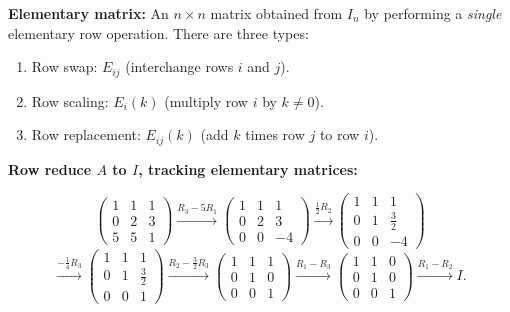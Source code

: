 \documentclass[12pt,a3paper]{article}
\begin{document}
\begin{tcolorbox}[enhanced,breakable,
  colback=cA!4,colframe=cA,boxrule=0.8pt,arc=5pt,
  title={\textbf{Answer --- Elementary Matrices; $A=\begin{pmatrix}1&1&1\\0&2&3\\5&5&1\end{pmatrix}$ as Product}},
  fonttitle=\bfseries\color{white},colbacktitle=cA]
 
\textbf{Elementary matrix:} An $n\times n$ matrix obtained from $I_n$ by performing a \emph{single} elementary row operation. There are three types:
\begin{enumerate}[label=(\roman*),itemsep=2pt]
  \item Row swap: $E_{ij}$ (interchange rows $i$ and $j$).
  \item Row scaling: $E_i(k)$ (multiply row $i$ by $k\neq0$).
  \item Row replacement: $E_{ij}(k)$ (add $k$ times row $j$ to row $i$).
\end{enumerate}
 
\textbf{Row reduce $A$ to $I$, tracking elementary matrices:}
 
\[
\begin{pmatrix}1&1&1\\0&2&3\\5&5&1\end{pmatrix}
\xrightarrow{R_3-5R_1}
\begin{pmatrix}1&1&1\\0&2&3\\0&0&-4\end{pmatrix}
\xrightarrow{\frac{1}{2}R_2}
\begin{pmatrix}1&1&1\\0&1&\frac{3}{2}\\0&0&-4\end{pmatrix}
\]
\[
\xrightarrow{-\frac{1}{4}R_3}
\begin{pmatrix}1&1&1\\0&1&\frac{3}{2}\\0&0&1\end{pmatrix}
\xrightarrow{R_2-\frac{3}{2}R_3}
\begin{pmatrix}1&1&1\\0&1&0\\0&0&1\end{pmatrix}
\xrightarrow{R_1-R_3}
\begin{pmatrix}1&1&0\\0&1&0\\0&0&1\end{pmatrix}
\xrightarrow{R_1-R_2}
I.
\]
 

\end{tcolorbox}
\end{document}
